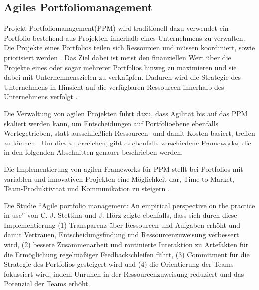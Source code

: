 \subsection{Agiles Portfoliomanagement}
Projekt Portfoliomanagement(PPM) wird traditionell dazu verwendet ein Portfolio bestehend aus Projekten innerhalb eines Unternehmens zu verwalten. Die Projekte eines Portfolios teilen sich Ressourcen und müssen koordiniert, sowie priorisiert werden \cite{NGUYEN20181054}.
Das Ziel dabei ist meist den finanziellen Wert über die Projekte eines oder sogar mehrerer Portfolios hinweg zu maximieren und sie dabei mit Unternehmenszielen zu verknüpfen. Dadurch wird die Strategie des Unternehmens in Hinsicht auf die verfügbaren Ressourcen innerhalb des Unternehmens verfolgt \cite{MARTINSUO200756}.

Die Verwaltung von agilen Projekten führt dazu, dass Agilität bis auf das PPM skaliert werden kann, um Entscheidungen auf Portfolioebene ebenfalls Wertegetrieben, statt ausschließlich Ressourcen- und damit Kosten-basiert, treffen zu können \cite{SUAREZ2022-1}. Um dies zu erreichen, gibt es ebenfalls verschiedene Frameworks, die in den folgenden Abschnitten genauer beschrieben werden.

Die Implementierung von agilen Frameworks für PPM stellt bei Portfolios mit variablen und innovativen Projekten eine Möglichkeit dar, Time-to-Market, Team-Produktivität und Kommunikation zu steigern \cite{SUAREZ2022-2}.

Die Studie ``Agile portfolio management: An empirical perspective on the practice in use'' von C. J. Stettina und J. Hörz \cite{anEmpiricalPerspectiveOnThePractiveInUse} zeigte ebenfalls, dass sich durch diese Implementierung (1) Transparenz über Ressourcen und Aufgaben erhöht und damit Vertrauen, Entscheidungsfindung und Ressourcenzuweisung verbessert wird, (2) bessere Zusammenarbeit und routinierte Interaktion zu Artefakten für die Ermöglichung regelmäßiger Feedbackschleifen führt, (3) Commitment für die Strategie des Portfolios gesteigert wird und (4) die Orientierung der Teams fokussiert wird, indem Unruhen in der Ressourcenzuweisung reduziert und das Potenzial der Teams erhöht.

